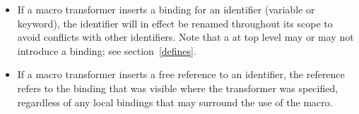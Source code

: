 \begin{itemize}

\item If a macro transformer inserts a binding for an identifier
(variable or keyword), the identifier will in effect be renamed
throughout its scope to avoid conflicts with other identifiers.
Note that a  at top level may or may not introduce a binding;
see section~\ref{defines}.

\item If a macro transformer inserts a free reference to an
identifier, the reference refers to the binding that was visible
where the transformer was specified, regardless of any local
bindings that may surround the use of the macro.

\end{itemize}

